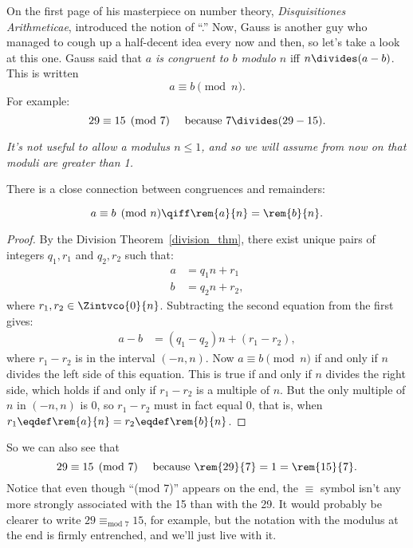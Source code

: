 On the first page of his masterpiece on number theory,
\emph{Disquisitiones Arithmeticae},  introduced the notion
of ``.''  Now, 
Gauss is another guy who managed to
cough up a half-decent idea every now and then, so let's take a look
at this one.  Gauss said that \emph{$a$ is congruent to $b$
  modulo $n$} iff $n \divides (a - b)$.
This is written
\[
a \equiv b \pmod{n}.
\]
For example:
\[
29 \equiv 15 \pmod{7} \quad\text{ because } 7 \divides (29 - 15).
\]

\emph{It's not useful to allow a modulus $n \leq 1$, and so we will
  assume from now on that moduli are greater than 1.}

There is a close connection between congruences and remainders:
\begin{lemma}[Remainder]\label{lem:conrem}
\[
a \equiv b \pmod{n} \qiff \rem{a}{n} = \rem{b}{n}.
\]
\end{lemma}

\begin{proof}
By the Division Theorem~\ref{division_thm}, there exist unique pairs
of integers $q_1, r_1$ and $q_2, r_2$ such that:
\begin{align*}
a & = q_1 n + r_1\\
b & = q_2 n + r_2,
\end{align*}
where $r_1,r_2 \in \Zintvco{0}{n}$.  Subtracting the second equation from the
  first gives:
\begin{align*}
a - b & = (q_1 - q_2) n + (r_1 - r_2),
\end{align*}
where $r_1 - r_2$ is in the interval $(-n,n)$.  Now $a \equiv b
\pmod{n}$ if and only if $n$ divides the left side of this equation.
This is true if and only if $n$ divides the right side, which holds if
and only if $r_1 - r_2$ is a multiple of $n$.  But the only multiple
of $n$ in $(-n,n)$ is 0, so $r_1 - r_2$ must in fact equal 0, that is,
when $r_1 \eqdef \rem{a}{n} = r_2 \eqdef \rem{b}{n}$.
\end{proof}

So we can also see that
\[
29 \equiv 15 \pmod{7} \quad\text{ because } \rem{29}{7} = 1 =
\rem{15}{7}.
\]
Notice that even though ``(mod 7)'' appears on the end, the $\equiv$
symbol isn't any more strongly associated with the 15 than with the
29.  It would probably be clearer to write $29 \equiv_{\text{mod } 7}
15$, for example, but the notation with the modulus at the end is
firmly entrenched, and we'll just live with it.

